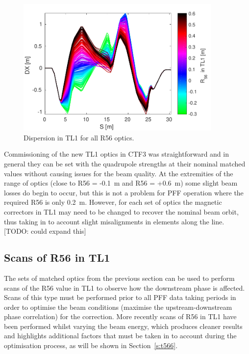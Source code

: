 \begin{figure}
  \centering
  \includegraphics[width=0.9\textwidth]{Figures/propagation/DX}
  \caption{Dispersion in TL1 for all R56 optics.}
  \label{f:tl1DX}
\end{figure}

Commissioning of the new TL1 optics in CTF3 was straightforward and in general they can be set with the quadrupole strengths at their nominal matched values without causing issues for the beam quality. At the extremities of the range of optics (close to R56 = -0.1~m and R56 = +0.6~m) some slight beam losses do begin to occur, but this is not a problem for PFF operation where the required R56 is only 0.2~m. However, for each set of optics the magnetic correctors in TL1 may need to be changed to recover the nominal beam orbit, thus taking in to account slight misalignments in elements along the line. [TODO: could expand this] 

\subsection{Scans of R56 in TL1}
\label{ss:r56Scans}

The sets of matched optics from the previous section can be used to perform scans of the R56 value in TL1 to observe how the downstream phase is affected. Scans of this type must be performed prior to all PFF data taking periods in order to optimise the beam conditions (maximise the upstream-downstream phase correlation) for the correction. More recently scans of R56 in TL1 have been performed whilst varying the beam energy, which produces cleaner results and highlights additional factors that must be taken in to account during the optimisation process, as will be shown in Section~\ref{s:t566}. 

